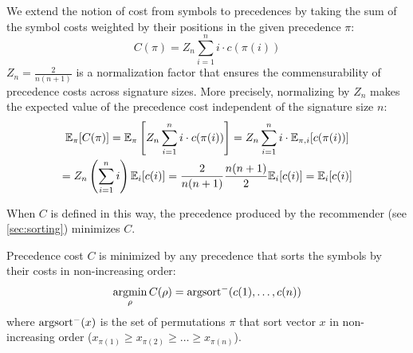 
We extend the notion of cost from symbols to precedences
by taking the sum of the symbol costs
weighted by their positions in the given precedence $\pi$:
\begin{equation*} \label{eq:cost_model}
C(\pi) = Z_n \sum_{i=1}^n i \cdot c(\pi(i))%
\end{equation*}
$Z_n = \frac{2}{n(n+1)}$ is a normalization factor
that ensures the commensurability of precedence costs across signature sizes.
More precisely, normalizing by $Z_n$ makes the expected value of the precedence cost
independent of the signature size $n$:
\begin{multline*}
\mathbb{E}_\pi [C(\pi)]
= \mathbb{E}_\pi \left[Z_n \sum_{i=1}^n i \cdot c(\pi(i))\right]
= Z_n \sum_{i=1}^n i \cdot \mathbb{E}_{\pi, i} [c(\pi(i))] \\
= Z_n \left(\sum_{i=1}^n i\right) \mathbb{E}_i [c(i)]
= \frac{2}{n(n+1)} \frac{n(n+1)}{2} \mathbb{E}_i [c(i)]
= \mathbb{E}_i [c(i)]
\end{multline*}

When $C$ is defined in this way,
the precedence produced by the recommender (see \cref{sec:sorting}) minimizes $C$.

\begin{lemma}
Precedence cost $C$ is minimized by any precedence that sorts the symbols by their costs in non-increasing order:
$$
\operatorname*{argmin}_\rho C(\rho) = \operatorname{argsort}^- (c(1), \ldots, c(n))
$$
where $\operatorname{argsort}^-(x)$ is the set of permutations $\pi$
that sort vector $x$ in non-increasing order ($x_{\pi(1)} \geq x_{\pi(2)} \geq \ldots \geq x_{\pi(n)}$).
\end{lemma}

